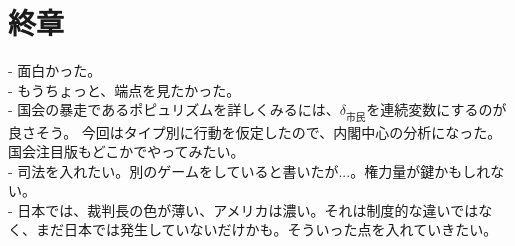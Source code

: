 \documentclass[main.tex]{subfiles}
\begin{document}
\section{終章}


- 面白かった。\\

- もうちょっと、端点を見たかった。\\

- 国会の暴走であるポピュリズムを詳しくみるには、$\delta_{市民}$を連続変数にするのが良さそう。
今回はタイプ別に行動を仮定したので、内閣中心の分析になった。国会注目版もどこかでやってみたい。\\

- 司法を入れたい。別のゲームをしていると書いたが...。権力量が鍵かもしれない。\\

- 日本では、裁判長の色が薄い、アメリカは濃い。それは制度的な違いではなく、まだ日本では発生していないだけかも。そういった点を入れていきたい。\\
\end{document}
